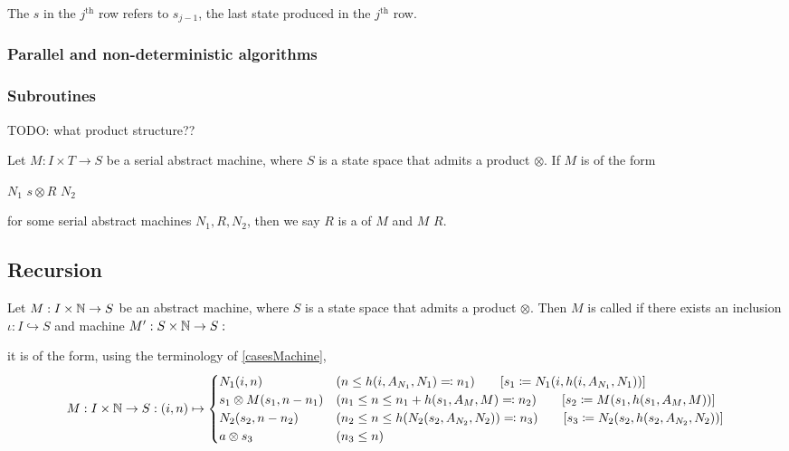 The $s$ in the $j^\text{th}$ row refers to $s_{j-1}$, the last state produced in the $j^\text{th}$ row.

\subsubsection{Parallel and non-deterministic algorithms}

\subsubsection{Subroutines}
TODO: what product structure??
\begin{definition}
Let $M: I\times T\to S$ be a serial abstract machine, where $S$ is a state space that admits a product $\otimes$. 
If $M$ is of the form
\begin{centeredAlgorithm}
$N_1$\;
$s\otimes R$\;
$N_2$\;
\end{centeredAlgorithm}
for some serial abstract machines $N_1, R, N_2$, then we say $R$
is a  of $M$ and $M$  $R$.
\end{definition}



\subsection{Recursion}
\begin{definition}
Let $M: I\times \mathbb{N}\to S$ be an abstract machine, where $S$ is a state space that admits a product $\otimes$. Then $M$ is called  if there exists an inclusion $\iota: I\hookrightarrow S$ and machine $M': S\times \mathbb{N} \to S: $




it is of the form, using the terminology of \ref{casesMachine},
\[ M: I\times \mathbb{N}\to S: (i,n) \mapsto \begin{cases}
N_1(i,n) & (n \leq h(i,A_{N_1},N_1) \eqqcolon n_1) \qquad [s_1 \coloneqq N_1(i,h(i,A_{N_1},N_1))] \\
s_1 \otimes M(s_1, n - n_1) & (n_1 \leq n \leq n_1 + h(s_1,A_M,M) \eqqcolon n_2)  \qquad [s_2 \coloneqq M(s_1,h(s_1,A_{M},M))]  \\
N_2(s_2, n - n_2) & (n_2 \leq n \leq h(N_2(s_2, A_{N_2}, N_2)) \eqqcolon n_3) \qquad [s_3 \coloneqq N_2(s_2,h(s_2,A_{N_2},N_2))] \\
a\otimes s_3 & (n_3 \leq n)
\end{cases}  \]
\end{definition}


